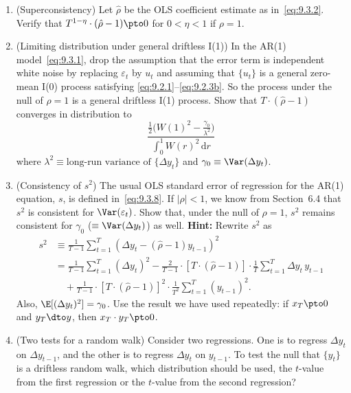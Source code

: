 \begin{enumerate}
\item (Superconsistency) \enspace Let $\hat{\rho}$ be the OLS coefficient estimate as in~\eqref{eq:9.3.2}. Verify
that $T^{1-\eta} \cdot (\hat{\rho} - 1) \pto 0$ for $0 < \eta < 1$ if $\rho = 1$.

\item (Limiting distribution under general driftless I(1)) \enspace In the AR(1) model~\eqref{eq:9.3.1},
drop the assumption that the error term is independent white noise by replacing
$\varepsilon_t$ by $u_t$ and assuming that $\{u_t\}$ is a general zero-mean I(0) process satisfying
\eqref{eq:9.2.1}--\eqref{eq:9.2.3b}. So the process under the null of $\rho = 1$ is a general driftless
I(1) process. Show that $T \cdot (\hat{\rho} - 1)$ converges in distribution to
\[
\frac{\tfrac{1}{2}\big(W(1)^2 - \tfrac{\gamma_0}{\lambda^2}\big)}{\int_0^1 W(r)^2\,\mathrm{d}r}
\]
where $\lambda^2 \equiv \text{long-run variance of } \{\Delta y_t\}$ and $\gamma_0 \equiv \Var(\Delta y_t)$.

\item (Consistency of $s^2$) \enspace The usual OLS standard error of regression for the AR(1)
equation, $s$, is defined in~\eqref{eq:9.3.8}. If $|\rho| < 1$, we know from Section~6.4 that
$s^2$ is consistent for $\Var(\varepsilon_t)$. Show that, under the null of $\rho = 1$, $s^2$ remains
consistent for $\gamma_0$ ($\equiv \Var(\Delta y_t)$) as well. \textbf{Hint:} Rewrite $s^2$ as
\begin{align*}
s^2 &\equiv \frac{1}{T-1}\sum_{t=1}^{T} (\Delta y_t - (\hat{\rho}-1) y_{t-1})^2 \\
&= \frac{1}{T-1}\sum_{t=1}^{T}(\Delta y_t)^2
- \frac{2}{T-1} \cdot [T \cdot (\hat{\rho}-1)] \cdot \frac{1}{T}\sum_{t=1}^{T}\Delta y_t\, y_{t-1} \\
&\quad + \frac{1}{T-1} \cdot [T \cdot (\hat{\rho}-1)]^2 \cdot \frac{1}{T^2}\sum_{t=1}^{T}(y_{t-1})^2.
\end{align*}
Also, $\E[(\Delta y_t)^2] = \gamma_0$. Use the result we have used repeatedly: if $x_T \pto 0$ and
$y_T \dto y$, then $x_T \cdot y_T \pto 0$.

\item (Two tests for a random walk) \enspace Consider two regressions. One is to regress
$\Delta y_t$ on $\Delta y_{t-1}$, and the other is to regress $\Delta y_t$ on $y_{t-1}$. To test the null that $\{y_t\}$
is a driftless random walk, which distribution should be used, the $t$-value from
the first regression or the $t$-value from the second regression?


\end{enumerate}
